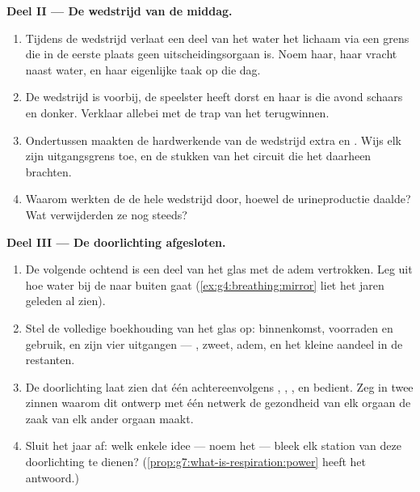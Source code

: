 \begin{problem}
\medskip\noindent\textbf{Deel II --- De wedstrijd van de
middag.}
\begin{enumerate}[resume]
  \item Tijdens de wedstrijd verlaat een deel van het water het lichaam
        via een grens die in de eerste plaats geen uitscheidingsorgaan is.
        Noem haar, haar vracht naast water, en haar eigenlijke taak op die
        dag.
  \item De wedstrijd is voorbij, de speelster heeft dorst en haar  is
        die avond schaars en donker. Verklaar allebei met de trap van het
        terugwinnen.
  \item Ondertussen maakten de hardwerkende  van de wedstrijd extra
         en . Wijs elk zijn uitgangsgrens toe, en de
        stukken van het circuit die het daarheen brachten.
  \item Waarom werkten de  de hele wedstrijd door, hoewel de
        urineproductie daalde? Wat verwijderden ze nog steeds?
\end{enumerate}

\medskip\noindent\textbf{Deel III --- De doorlichting afgesloten.}
\begin{enumerate}[resume]
  \item De volgende ochtend is een deel van het glas met de adem
        vertrokken. Leg uit hoe water bij de  naar buiten gaat
        (\cref{ex:g4:breathing:mirror} liet het jaren geleden al zien).
  \item Stel de volledige boekhouding van het glas op: binnenkomst,
        voorraden en gebruik, en zijn vier uitgangen --- , zweet,
        adem, en het kleine aandeel in de restanten.
  \item De doorlichting laat zien dat één  achtereenvolgens ,
        , ,  en  bedient. Zeg in twee zinnen
        waarom dit ontwerp met één netwerk de gezondheid van elk orgaan de
        zaak van elk ander orgaan maakt.
  \item Sluit het jaar af: welk enkele idee --- noem het --- bleek elk
        station van deze doorlichting te dienen?
        (\cref{prop:g7:what-is-respiration:power} heeft het antwoord.)
\end{enumerate}
\end{problem}
